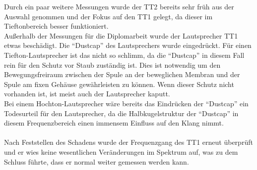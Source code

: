 \newpage
Durch ein paar weitere Messungen wurde der TT2 bereits sehr früh aus der Auswahl genommen und der Fokus auf den TT1 gelegt, da dieser im Tieftonbereich besser funktioniert.
\\
Außerhalb der Messungen für die Diplomarbeit wurde der Lautsprecher TT1 etwas beschädigt.
Die \enquote{Dustcap} des Lautsprechers wurde eingedrückt.
Für einen Tiefton-Lautsprecher ist das nicht so schlimm, da die \enquote{Dustcap} in diesem Fall rein für den Schutz vor Staub zuständig ist.
Dies ist notwendig um den Bewegungsfreiraum zwischen der Spule an der beweglichen Membran und der Spule am fixen Gehäuse gewährleisten zu können.
Wenn dieser Schutz nicht vorhanden ist, ist meist auch der Lautsprecher kaputt.\\
Bei einem Hochton-Lautsprecher wäre bereits das Eindrücken der \enquote{Dustcap} ein Todesurteil für den Lautsprecher, da die Halbkugelstruktur der \enquote{Dustcap} in diesem Frequenzbereich einen immensem Einfluss auf den Klang nimmt.
\\ \\
Nach Feststellen des Schadens wurde der Frequenzgang des TT1 erneut überprüft und er wies keine wesentlichen Veränderungen im Spektrum auf, was zu dem Schluss führte, dass er normal weiter gemessen werden kann.
\\













